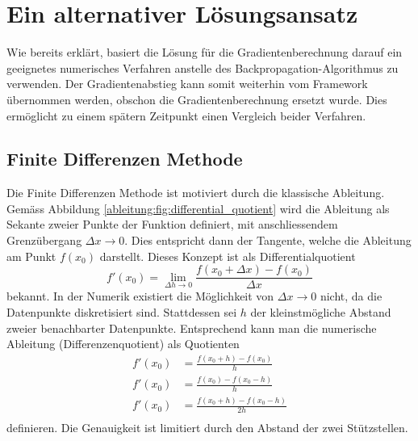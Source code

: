 %
%
%
\section{Ein alternativer Lösungsansatz
\label{ableitung:section:loesung}}
Wie bereits erklärt, basiert die Lösung für die Gradientenberechnung darauf ein geeignetes numerisches Verfahren anstelle des Backpropagation-Algorithmus zu verwenden.
Der Gradientenabstieg kann somit weiterhin vom Framework übernommen werden, obschon die Gradientenberechnung ersetzt wurde.
Dies ermöglicht zu einem spätern Zeitpunkt einen Vergleich beider Verfahren.
\subsection{Finite Differenzen Methode}
Die Finite Differenzen Methode ist motiviert durch die klassische Ableitung.
Gemäss Abbildung \ref{ableitung:fig:differential_quotient} wird die
Ableitung als Sekante zweier Punkte der Funktion definiert, mit
anschliessendem Grenzübergang $\Delta x \rightarrow 0$.
Dies entspricht dann der Tangente, welche die Ableitung am Punkt $f(x_0)$ darstellt.
Dieses Konzept ist als Differentialquotient
\begin{equation}
f'(x_0) = \lim_{{\Delta h} \rightarrow 0} \frac{f(x_0+\Delta x) - f(x_0)}{\Delta x}
\label{ableitung:equations:differentialquotient}
\end{equation}
bekannt.
In der Numerik existiert die Möglichkeit von $\Delta x \rightarrow 0$ nicht, da die Datenpunkte diskretisiert sind.
Stattdessen sei $h$ der kleinstmögliche Abstand zweier benachbarter Datenpunkte.
Entsprechend kann man die numerische Ableitung (Differenzenquotient) als Quotienten
\begin{equation}
\begin{split}
f'(x_0) &= \frac{f(x_0 + h) - f(x_0)}{h} \\
f'(x_0) &= \frac{f(x_0) - f(x_0 - h)}{h} \\
f'(x_0) &= \frac{f(x_0 + h) - f(x_0 - h)}{2h} \\
\end{split}
\label{ableitung:equations:differenzenquotient}
\end{equation}
definieren.
Die Genauigkeit ist limitiert durch den Abstand der zwei Stützstellen.
